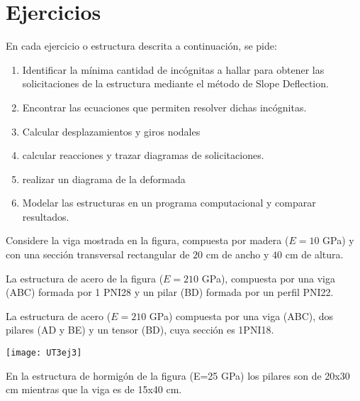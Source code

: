 \section{Ejercicios}
\setcounter{ejercicio}{0}

En cada ejercicio o estructura descrita a continuación, se pide:
%
\begin{enumerate}
  \item Identificar la mínima cantidad de incógnitas a hallar para obtener las solicitaciones de la estructura mediante el método de Slope Deflection.
  \item  Encontrar las ecuaciones que permiten resolver dichas incógnitas.
  \item  Calcular desplazamientos y giros nodales
  \item calcular reacciones y trazar diagramas de solicitaciones.
  \item realizar un diagrama de la deformada
  \item  Modelar las estructuras en un programa computacional y comparar resultados.
\end{enumerate}

\ejercicio

Considere la viga mostrada en la figura, compuesta por madera ($E=10$ GPa) y con una sección transversal rectangular de $20$ cm de ancho y $40$ cm de altura.

\begin{center}
	\def\svgwidth{0.8\textwidth}
	
\end{center}


\ejercicio

La estructura de acero de la figura ($E=210$ GPa), compuesta por una viga (ABC) formada por 1 PNI28 y un pilar (BD) formada por un perfil PNI22.

\begin{center}
	\def\svgwidth{0.8\textwidth}
	
\end{center}


\ejercicio

La estructura de acero ($E=210$ GPa) compuesta por una viga (ABC), dos pilares (AD y BE) y un tensor (BD), cuya sección es 1PNI18.

\begin{center}
	\texttt{[image: UT3ej3]}
\end{center}

\ejercicio

En la estructura de hormigón de la figura (E=25 GPa) los pilares son de 20x30 cm mientras que la viga es de 15x40 cm. 

